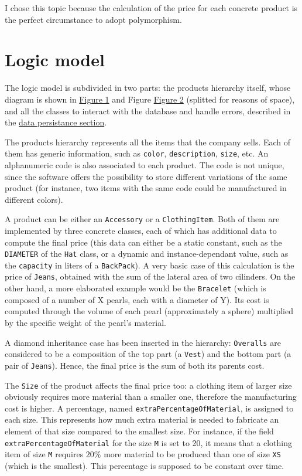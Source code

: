 \documentclass[10pt]{article}
\begin{document}
I chose this topic because the calculation of the price for each concrete
product is the perfect circumstance to adopt polymorphism.

\section{Logic model}
The logic model is subdivided in two parts: the products hierarchy itself,
whose diagram is shown in \hyperref[fig:accessoriesUML]{Figure 1} and Figure
\hyperref[fig:clothingItemsUML]{Figure 2} (splitted for reasons of space), and
all the classes to interact with the database and handle errors, described in
the \hyperref[sec:dataPersistance]{data persistance section}.

The products hierarchy represents all the items that the company sells. Each of
them has generic information, such as \texttt{color}, \texttt{description},
\texttt{size}, etc. An alphanumeric code is also associated to each product.
The code is not unique, since the software offers the possibility to store
different variations of the same product (for instance, two items with the same
code could be manufactured in different colors).

A product can be either an \texttt{Accessory} or a \texttt{ClothingItem}. Both
of them are implemented by three concrete classes, each of which has additional
data to compute the final price (this data can either be a static constant,
such as the \texttt{DIAMETER} of the \texttt{Hat} class, or a dynamic and
instance-dependant value, such as the \texttt{capacity} in liters of a
\texttt{BackPack}). A very basic case of this calculation is the price of
\texttt{Jeans}, obtained with the sum of the lateral area of two cilinders. On
the other hand, a more elaborated example would be the \texttt{Bracelet} (which
is composed of a number of X pearls, each with a diameter of Y). Its cost is
computed through the volume of each pearl (approximately a sphere) multiplied
by the specific weight of the pearl's material.

A diamond inheritance case has been inserted in the hierarchy:
\texttt{Overalls} are considered to be a composition of the top part (a
\texttt{Vest}) and the bottom part (a pair of \texttt{Jeans}). Hence, the final
price is the sum of both its parents cost.

The \texttt{Size} of the product affects the final price too: a clothing item
of larger size obviously requires more material than a smaller one, therefore
the manufacturing cost is higher. A percentage, named
\texttt{extraPercentageOfMaterial}, is assigned to each size. This represents
how much extra material is needed to fabricate an element of that size compared
to the smallest size. For instance, if the field
\texttt{extraPercentageOfMaterial} for the size \texttt{M} is set to 20, it
means that a clothing item of size \texttt{M} requires $20\%$ more material to
be produced than one of size \texttt{XS} (which is the smallest). This
percentage is supposed to be constant over time.
\end{document}
